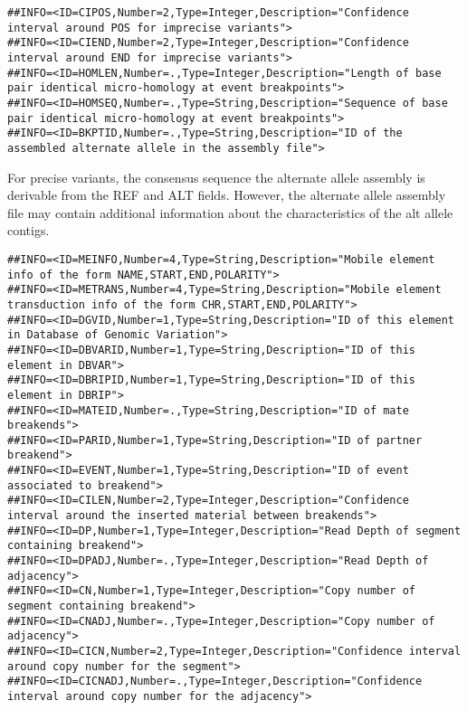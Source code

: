 \documentclass[8pt]{article}
\begin{document}
\footnotesize
\begin{verbatim}
##INFO=<ID=CIPOS,Number=2,Type=Integer,Description="Confidence interval around POS for imprecise variants">
##INFO=<ID=CIEND,Number=2,Type=Integer,Description="Confidence interval around END for imprecise variants">
##INFO=<ID=HOMLEN,Number=.,Type=Integer,Description="Length of base pair identical micro-homology at event breakpoints">
##INFO=<ID=HOMSEQ,Number=.,Type=String,Description="Sequence of base pair identical micro-homology at event breakpoints">
##INFO=<ID=BKPTID,Number=.,Type=String,Description="ID of the assembled alternate allele in the assembly file">
\end{verbatim}
\normalsize
For precise variants, the consensus sequence the alternate allele assembly is derivable from the REF and ALT fields. However, the alternate allele assembly file may contain additional information about the characteristics of the alt allele contigs.

\footnotesize
\begin{verbatim}
##INFO=<ID=MEINFO,Number=4,Type=String,Description="Mobile element info of the form NAME,START,END,POLARITY">
##INFO=<ID=METRANS,Number=4,Type=String,Description="Mobile element transduction info of the form CHR,START,END,POLARITY">
##INFO=<ID=DGVID,Number=1,Type=String,Description="ID of this element in Database of Genomic Variation">
##INFO=<ID=DBVARID,Number=1,Type=String,Description="ID of this element in DBVAR">
##INFO=<ID=DBRIPID,Number=1,Type=String,Description="ID of this element in DBRIP">
##INFO=<ID=MATEID,Number=.,Type=String,Description="ID of mate breakends">
##INFO=<ID=PARID,Number=1,Type=String,Description="ID of partner breakend">
##INFO=<ID=EVENT,Number=1,Type=String,Description="ID of event associated to breakend">
##INFO=<ID=CILEN,Number=2,Type=Integer,Description="Confidence interval around the inserted material between breakends">
##INFO=<ID=DP,Number=1,Type=Integer,Description="Read Depth of segment containing breakend">
##INFO=<ID=DPADJ,Number=.,Type=Integer,Description="Read Depth of adjacency">
##INFO=<ID=CN,Number=1,Type=Integer,Description="Copy number of segment containing breakend">
##INFO=<ID=CNADJ,Number=.,Type=Integer,Description="Copy number of adjacency">
##INFO=<ID=CICN,Number=2,Type=Integer,Description="Confidence interval around copy number for the segment">
##INFO=<ID=CICNADJ,Number=.,Type=Integer,Description="Confidence interval around copy number for the adjacency">
\end{verbatim}
\normalsize
\end{document}
